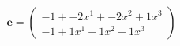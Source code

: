 \documentclass[preview]{standalone}
\begin{document}
\begin{align*}
\mathbf{e} = \begin{pmatrix}-1 + -2x^{1} + -2x^{2} + 1x^{3} \\ -1 + 1x^{1} + 1x^{2} + 1x^{3}\end{pmatrix}
\end{align*}
\end{document}
